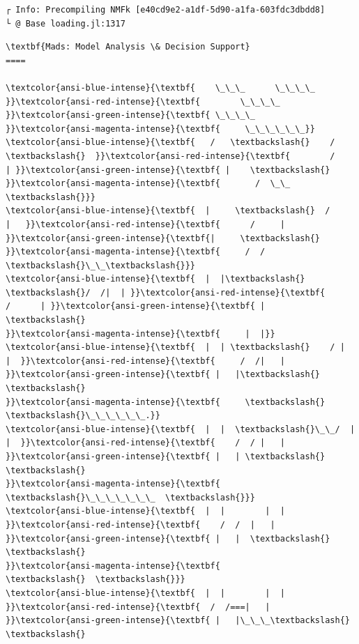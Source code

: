 \documentclass[11pt]{article}
\begin{document}
    \begin{Verbatim}[commandchars=\\\{\}]
┌ Info: Precompiling NMFk [e40cd9e2-a1df-5d90-a1fa-603fdc3dbdd8]
└ @ Base loading.jl:1317
    \end{Verbatim}

    \begin{Verbatim}[commandchars=\\\{\}]
\textbf{Mads: Model Analysis \& Decision Support}
====

\textcolor{ansi-blue-intense}{\textbf{    \_\_\_      \_\_\_\_    }}\textcolor{ansi-red-intense}{\textbf{        \_\_\_\_   }}\textcolor{ansi-green-intense}{\textbf{ \_\_\_\_
}}\textcolor{ansi-magenta-intense}{\textbf{     \_\_\_\_\_\_}}
\textcolor{ansi-blue-intense}{\textbf{   /   \textbackslash{}    /    \textbackslash{}  }}\textcolor{ansi-red-intense}{\textbf{        /    | }}\textcolor{ansi-green-intense}{\textbf{ |    \textbackslash{}
}}\textcolor{ansi-magenta-intense}{\textbf{       /  \_\_  \textbackslash{}}}
\textcolor{ansi-blue-intense}{\textbf{  |     \textbackslash{}  /     |   }}\textcolor{ansi-red-intense}{\textbf{      /     |  }}\textcolor{ansi-green-intense}{\textbf{|     \textbackslash{}
}}\textcolor{ansi-magenta-intense}{\textbf{     /  /  \textbackslash{}\_\_\textbackslash{}}}
\textcolor{ansi-blue-intense}{\textbf{  |  |\textbackslash{}  \textbackslash{}/  /|  | }}\textcolor{ansi-red-intense}{\textbf{       /      | }}\textcolor{ansi-green-intense}{\textbf{ |      \textbackslash{}
}}\textcolor{ansi-magenta-intense}{\textbf{     |  |}}
\textcolor{ansi-blue-intense}{\textbf{  |  | \textbackslash{}    / |  |  }}\textcolor{ansi-red-intense}{\textbf{     /  /|   | }}\textcolor{ansi-green-intense}{\textbf{ |   |\textbackslash{}  \textbackslash{}
}}\textcolor{ansi-magenta-intense}{\textbf{     \textbackslash{}  \textbackslash{}\_\_\_\_\_\_.}}
\textcolor{ansi-blue-intense}{\textbf{  |  |  \textbackslash{}\_\_/  |  |  }}\textcolor{ansi-red-intense}{\textbf{    /  / |   | }}\textcolor{ansi-green-intense}{\textbf{ |   | \textbackslash{}  \textbackslash{}
}}\textcolor{ansi-magenta-intense}{\textbf{      \textbackslash{}\_\_\_\_\_\_\_  \textbackslash{}}}
\textcolor{ansi-blue-intense}{\textbf{  |  |        |  | }}\textcolor{ansi-red-intense}{\textbf{    /  /  |   | }}\textcolor{ansi-green-intense}{\textbf{ |   |  \textbackslash{}  \textbackslash{}
}}\textcolor{ansi-magenta-intense}{\textbf{             \textbackslash{}  \textbackslash{}}}
\textcolor{ansi-blue-intense}{\textbf{  |  |        |  |  }}\textcolor{ansi-red-intense}{\textbf{  /  /===|   | }}\textcolor{ansi-green-intense}{\textbf{ |   |\_\_\_\textbackslash{}  \textbackslash{}

\end{Verbatim}
\end{document}
